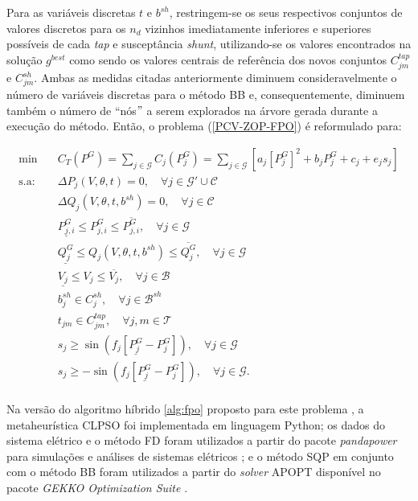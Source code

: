 \documentclass[
	12pt,				%
	openany,			%
	twoside,			%
	a4paper,			%
	chapter=TITLE,		%
	section=Title,		%
	subsection=Title,	%
	subsubsection=Title,%
	english,			%
	french,				%
	spanish,			%
	brazil			%
	]{abntex2}
\begin{document}
\begin{ERRATA}
Para as variáveis discretas $t$ e $b^{sh}$, restringem-se os seus respectivos conjuntos de valores discretos para os $n_d$ vizinhos imediatamente inferiores e superiores possíveis de cada \emph{tap} e susceptância \emph{shunt}, utilizando-se os valores encontrados na solução $g^{best}$ como sendo os valores centrais de referência dos novos conjuntos $C_{jm}^{tap}$ e $C_{jm}^{sh}$. Ambas as medidas citadas anteriormente diminuem consideravelmente o número de variáveis discretas para o método BB e, consequentemente, diminuem também o número de ``nós$"$ a serem explorados na árvore gerada durante a execução do método. Então, o problema (\ref{PCV-ZOP-FPO}) é reformulado para:


\begin{equation} \label{PCV-ZOP-FPO-2}
\begin{aligned}
\text{min}  &\quad C_T(P^{G}) = \sum_{j \in \mathcal{G}} C_j(P^{G}_j) = \sum_{j \in \mathcal{G}} [a_j[P^{G}_j]^2 + b_jP^{G}_j + c_j + e_js_j]\\
\text{s.a:} &\quad   \Delta P_j(V,\theta,t) = 0, \quad \forall j \in \mathcal{G}' \cup \mathcal{C} \\
&\quad   \Delta Q_j(V,\theta,t, b^{sh}) = 0, \quad \forall j \in \mathcal{C} \quad\\
&\quad \underline{P^{G}_{j,i}} \leq P^{G}_{j,i} \leq \overline{P^{G}_{j,i}},\quad \forall j \in \mathcal{G}\\
&\quad \underline{Q^{G}_{j}} \leq Q_{j}(V,\theta,t,b^{sh}) \leq \overline{Q^{G}_{j}}, \quad  \forall j \in \mathcal{G}\\
&\quad \underline{V_{j}} \leq V_{j} \leq \overline{V_{j}}, \quad  \forall j \in \mathcal{B}\\
&\quad b^{sh}_{j} \in C_{j}^{sh}, \quad \forall j \in \mathcal{B}^{sh}\\
&\quad t_{jm} \in C_{jm}^{tap},\quad \forall j,m \in \mathcal{T} \\
&\quad s_j \geq \sin(f_j[\underline{P^{G}_j}-P^{G}_j]), \quad \forall j \in \mathcal{G}\\
&\quad s_j \geq -\sin(f_j[\underline{P^{G}_j}-P^{G}_j]), \quad \forall j \in \mathcal{G}.\\
\end{aligned}
\end{equation}

Na versão do algoritmo híbrido \ref{alg:fpo} proposto para este problema , a metaheurística CLPSO foi implementada em linguagem Python; os dados do sistema elétrico e o método FD foram utilizados a partir do pacote \emph{pandapower} para simulações e análises de sistemas elétricos \cite{pp}; e o método SQP em conjunto com o método BB foram utilizados a partir do \emph{solver} APOPT disponível no pacote \emph{GEKKO Optimization Suite} \cite{apopt}.


\end{ERRATA}
\end{document}
